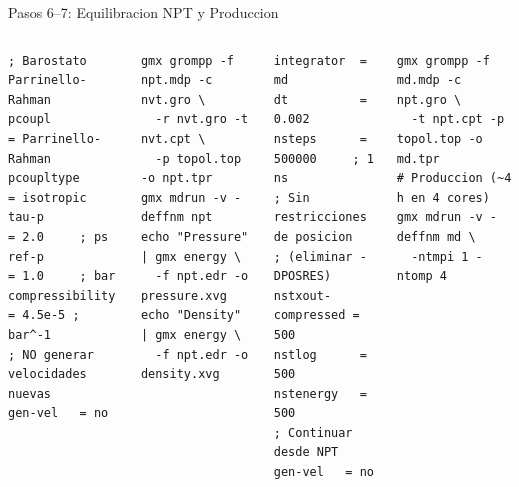 \documentclass[aspectratio=169, 10pt]{beamer}
\begin{document}
\begin{frame}[fragile,shrink=3]{Pasos 6--7: Equilibracion NPT y Produccion}
\begin{columns}[T]
\begin{tcolorbox}[warningbox, title={npt.mdp (cambios vs nvt.mdp)}]
\begin{lstlisting}[style=mdpstyle]
; Barostato Parrinello-Rahman
pcoupl         = Parrinello-Rahman
pcoupltype     = isotropic
tau-p          = 2.0     ; ps
ref-p          = 1.0     ; bar
compressibility = 4.5e-5 ; bar^-1
; NO generar velocidades nuevas
gen-vel   = no
\end{lstlisting}
\end{tcolorbox}
\begin{lstlisting}[style=bashstyle]
gmx grompp -f npt.mdp -c nvt.gro \
  -r nvt.gro -t nvt.cpt \
  -p topol.top -o npt.tpr
gmx mdrun -v -deffnm npt
echo "Pressure" | gmx energy \
  -f npt.edr -o pressure.xvg
echo "Density" | gmx energy \
  -f npt.edr -o density.xvg
\end{lstlisting}
\column{0.47\textwidth}
\begin{tcolorbox}[formulabox, title={md.mdp --- produccion 1 ns}]
\begin{lstlisting}[style=mdpstyle]
integrator  = md
dt          = 0.002
nsteps      = 500000     ; 1 ns
; Sin restricciones de posicion
; (eliminar -DPOSRES)
nstxout-compressed = 500
nstlog      = 500
nstenergy   = 500
; Continuar desde NPT
gen-vel   = no
\end{lstlisting}
\end{tcolorbox}
\begin{lstlisting}[style=bashstyle]
gmx grompp -f md.mdp -c npt.gro \
  -t npt.cpt -p topol.top -o md.tpr
# Produccion (~4 h en 4 cores)
gmx mdrun -v -deffnm md \
  -ntmpi 1 -ntomp 4
\end{lstlisting}
\end{columns}
\end{frame}
\end{document}
